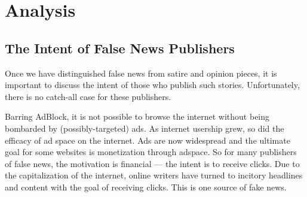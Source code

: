
\newcommand{\tenetbox}[1]{
    \begin{framed}
    \emph{#1}
    \end{framed}
    \vspace{2mm}
}

\newcommand{\tenetsection}[1]{
    \subsubsection{#1}
}

\newcommand{\dsr}[1]{
    \subsubsubsection{Domain Specific Rule}
    \begin{framed}
    \emph{#1}
    \end{framed}
}

\section{Analysis}






\subsection{The Intent of False News Publishers}

\par Once we have distinguished false news from satire and opinion pieces, it is important to discuss the intent of those who publish such stories. Unfortunately, there is no catch-all case for these publishers.

\par Barring AdBlock, it is not possible to browse the internet without being bombarded by (possibly-targeted) ads. As internet usership grew, so did the efficacy of ad space on the internet. Ads are now widespread and the ultimate goal for some websites is monetization through adspace. \cite{bbc_clickbait} So for many publishers of false news, the motivation is financial --- the intent is to receive clicks. Due to the capitalization of the internet, online writers have turned to incitory headlines and content with the goal of receiving clicks. This is one source of fake news.

